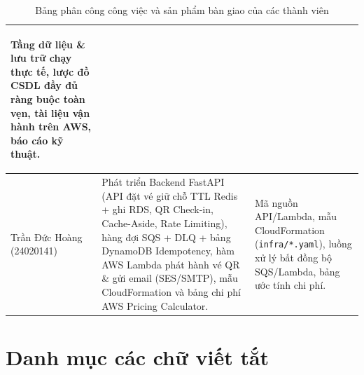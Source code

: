 \begin{table}[H]
\begin{tabularx}{\textwidth}{>{\bfseries\raggedright\arraybackslash}p{2.7cm} >{\raggedright\arraybackslash}X >{\raggedright\arraybackslash}p{3.9cm}}
      Tầng dữ liệu \& lưu trữ chạy thực tế, lược đồ CSDL đầy đủ ràng buộc toàn vẹn, tài liệu vận hành trên AWS, báo cáo kỹ thuật. \\
    \midrule
    Trần Đức Hoàng \newline (24020141) &
      Phát triển Backend FastAPI (API đặt vé giữ chỗ TTL Redis + ghi RDS, QR Check-in, Cache-Aside, Rate Limiting), hàng đợi SQS + DLQ + bảng DynamoDB Idempotency, hàm AWS Lambda phát hành vé QR \& gửi email (SES/SMTP), mẫu CloudFormation và bảng chi phí AWS Pricing Calculator. &
      Mã nguồn API/Lambda, mẫu CloudFormation (\texttt{infra/*.yaml}), luồng xử lý bất đồng bộ SQS/Lambda, bảng ước tính chi phí. \\
    \bottomrule
  \end{tabularx}
  \caption{Bảng phân công công việc và sản phẩm bàn giao của các thành viên}
  \label{tab:team-assignment}
\end{table}

\clearpage

\chapter*{Danh mục các chữ viết tắt}

